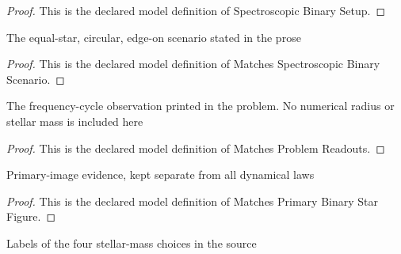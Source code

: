 \begin{proof}
  This is the declared model definition of Spectroscopic Binary Setup.
\end{proof}
\begin{definition}
  \label{def:physics:phyx-mini-0611:phyxminiproblems-problemphyxmini0611-matchesspectroscopicbinaryscenario}
  The equal-star, circular, edge-on scenario stated in the prose
\end{definition}
\begin{proof}
  This is the declared model definition of Matches Spectroscopic Binary Scenario.
\end{proof}
\begin{definition}
  \label{def:physics:phyx-mini-0611:phyxminiproblems-problemphyxmini0611-matchesproblemreadouts}
  The frequency-cycle observation printed in the problem. No numerical radius or stellar mass is included here
\end{definition}
\begin{proof}
  This is the declared model definition of Matches Problem Readouts.
\end{proof}
\begin{definition}
  \label{def:physics:phyx-mini-0611:phyxminiproblems-problemphyxmini0611-matchesprimarybinarystarfigure}
  Primary-image evidence, kept separate from all dynamical laws
\end{definition}
\begin{proof}
  This is the declared model definition of Matches Primary Binary Star Figure.
\end{proof}
\begin{definition}
  \label{def:physics:phyx-mini-0611:phyxminiproblems-problemphyxmini0611-massanswerchoice}
  Labels of the four stellar-mass choices in the source
\end{definition}
